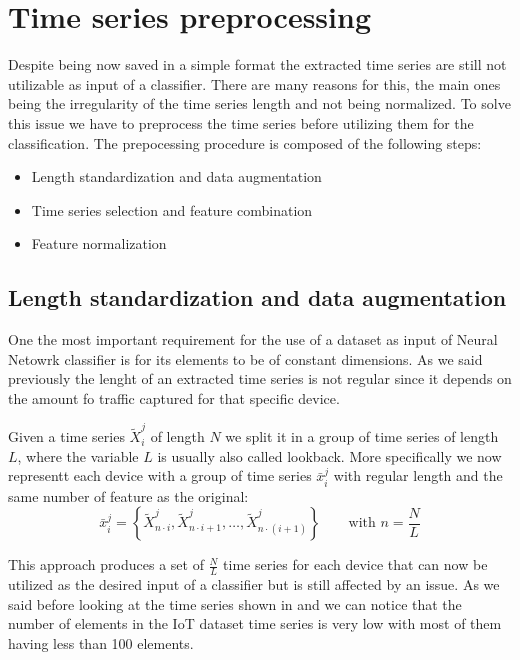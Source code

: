 \section{Time series preprocessing}

Despite being now saved in a simple format the extracted time series are still not utilizable as input of a classifier. There are many reasons for this, the main ones being the irregularity of the time series length and not being normalized. To solve this issue we have to preprocess the time series before utilizing them for the classification. 
The prepocessing procedure is composed of the following steps:
\begin{itemize}[noitemsep]
    \item {Length standardization} and data augmentation
    \item Time series selection and feature combination
    \item Feature normalization
\end{itemize}

\subsection{Length standardization and data augmentation}

One the most important requirement for the use of a dataset as input of Neural Netowrk classifier is for its elements to be of constant dimensions. As we said previously the lenght of an extracted time series is not regular since it depends on the amount fo traffic captured for that specific device.

Given a time series ${\tilde{X}_i^j}$ of length $N$ we split it in a group of time series of length $L$, where the variable $L$ is usually also called lookback. More specifically we now representt each device with a group of time series $\bar{x}_i^j$ with regular length and the same number of feature as the original:
\begin{equation}
    \bar{x}_i^j = \left\{\tilde{X}_{n\cdot i}^j, \tilde{X}_{n\cdot i +1 }^j, \dots, \tilde{X}_{n\cdot(i+1)}^j  \right\}
    \qquad\text{with }n=\frac{N}{L}
\end{equation}

This approach produces a set of $\frac{N}{L}$ time series for each device that can now be utilized as the desired input of a classifier but is still affected by an issue. As we said before looking at the time series shown in  and  we can notice that the number of elements in the IoT dataset time series is very low with most of them having less than 100 elements. 

